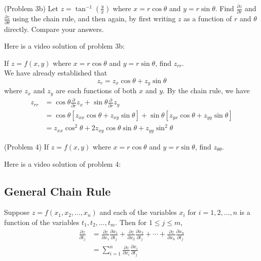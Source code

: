 \documentclass[handout]{ximera}
\begin{document}
\begin{problem}(Problem 3b)
Let $z = \tan^{-1}\left(\frac{y}{x}\right)$ where $x = r\cos \theta$ 
and $y = r\sin \theta$.  
Find $\frac{\partial z}{\partial r}$ and $\frac{\partial z}{\partial \theta}$ using 
the chain rule, and then again, 
by first writing $z$ as a function of $r$ and $\theta$ directly.
Compare your answers.
\end{problem}

Here is a video solution of problem 3b:\\
\begin{foldable}
\end{foldable}


\begin{example}[Example 4]
If $z = f(x,y)$ where $x = r\cos \theta$ and $y = r \sin \theta$, find $z_{rr}$.\\
We have already established that
\[
z_r = z_x \cos \theta  + z_y \sin \theta 
\]
where $z_x$ and $z_y$ are each functions of both $x$ and $y$. By the chain rule, we have
\begin{align*}
z_{rr} &= \cos \theta \frac{\partial}{\partial r} z_x + \sin \theta \frac{\partial}{\partial r} z_y\\
       &= \cos \theta \left[z_{xx}\cos \theta + z_{xy} \sin \theta \right] + 
       \sin \theta \left[ z_{yx} \cos \theta + z_{yy} \sin \theta  \right]\\
       &= z_{xx}\cos^2 \theta  + 2z_{xy}\cos \theta \sin \theta  + z_{yy}\sin^2 \theta 
\end{align*}
\end{example}

\begin{problem}(Problem 4) 
If $z = f(x,y)$ where $x = r\cos \theta$ and $y = r \sin \theta$, 
find $z_{\theta \theta}$.
\end{problem}

Here is a video solution of problem 4:\\
\begin{foldable}
\end{foldable}

       
\subsection{General Chain Rule}
Suppose $z = f(x_1, x_2, ..., x_n)$ and each of the variables $x_i$ 
for $i = 1, 2, ..., n$ is a function of the variables
$t_1, t_2,..., t_m$. Then for $1 \leq j \leq m$,
\begin{align*}
\frac{\partial z}{\partial t_j} &= \frac{\partial z}{\partial x_1}\frac{\partial x_1}{\partial t_j} 
                     + \frac{\partial z}{\partial x_2}\frac{\partial x_2}{\partial t_j} + \cdots + \frac{\partial z}{\partial x_n}\frac{\partial x_n}{\partial t_j}\\
                               &= \sum_{i = 1}^n \frac{\partial z}{\partial x_i}\frac{\partial x_i}{\partial t_j}
\end{align*}
\end{document}
